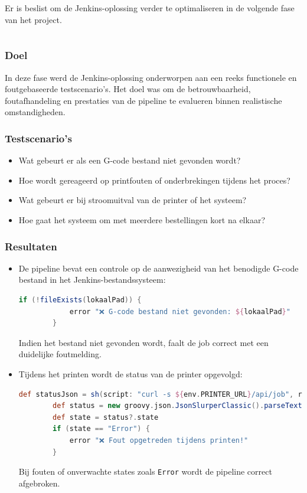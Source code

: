 \begin{enumerate}
Er is beslist om de Jenkins-oplossing verder te optimaliseren in de volgende fase van het project.

\chapter{}%
\label{ch:test-en-prestatie}

\subsection{Doel}
In deze fase werd de Jenkins-oplossing onderworpen aan een reeks functionele en foutgebaseerde testscenario’s. Het doel was om de betrouwbaarheid, foutafhandeling en prestaties van de pipeline te evalueren binnen realistische omstandigheden.

\subsection{Testscenario’s}
\begin{itemize}
    \item Wat gebeurt er als een G-code bestand niet gevonden wordt?
    \item Hoe wordt gereageerd op printfouten of onderbrekingen tijdens het proces?
    \item Wat gebeurt er bij stroomuitval van de printer of het systeem?
    \item Hoe gaat het systeem om met meerdere bestellingen kort na elkaar?
\end{itemize}

\subsection{Resultaten}
\begin{itemize}
    \item De pipeline bevat een controle op de aanwezigheid van het benodigde G-code bestand in het Jenkins-bestandssysteem:
    \begin{lstlisting}[language=groovy]
        if (!fileExists(lokaalPad)) {
            error "❌ G-code bestand niet gevonden: ${lokaalPad}"
        }
    \end{lstlisting}
    Indien het bestand niet gevonden wordt, faalt de job correct met een duidelijke foutmelding.
    
    \item Tijdens het printen wordt de status van de printer opgevolgd:
    \begin{lstlisting}[language=groovy]
        def statusJson = sh(script: "curl -s ${env.PRINTER_URL}/api/job", returnStdout: true)
        def status = new groovy.json.JsonSlurperClassic().parseText(statusJson)
        def state = status?.state
        if (state == "Error") {
            error "❌ Fout opgetreden tijdens printen!"
        }
    \end{lstlisting}
    Bij fouten of onverwachte states zoals \texttt{Error} wordt de pipeline correct afgebroken.
    

\end{itemize}
\end{enumerate}

